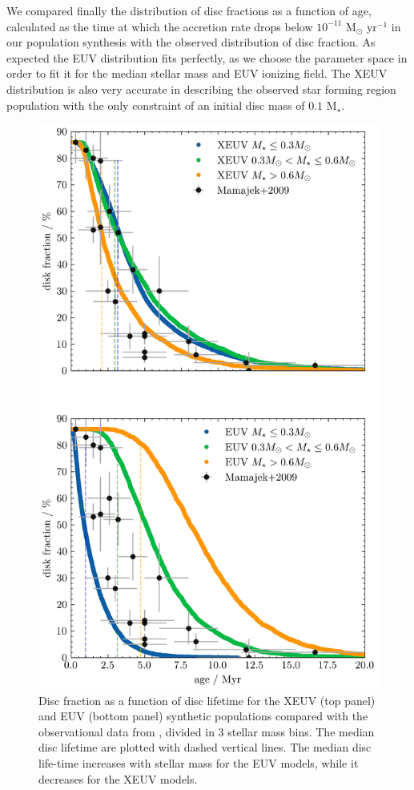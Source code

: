 \documentclass[fleqn,usenatbib,letters]{mnras}
\begin{document}
We compared finally the distribution of disc fractions as a function of age, calculated as the time at which the accretion rate drops below $10^{-11}$ M$_\odot$ yr$^{-1}$ in our population synthesis with the observed distribution of disc fraction. As expected the EUV distribution fits perfectly, as we choose the parameter space in order to fit it for the median stellar mass and EUV ionizing field. The XEUV distribution is also very accurate in describing the observed star forming region population with the only constraint of an initial disc mass of $0.1$ M$_\star$.
\begin{figure}
    \includegraphics[width=0.92\columnwidth]{disk_lifetime.png}
    \caption{Disc fraction as a function of disc lifetime for the XEUV (top panel) and EUV (bottom panel) synthetic populations compared with the observational data from \citet{Mamajek2009}, divided in 3 stellar mass bins. The median disc lifetime are plotted with dashed vertical lines. The median disc life-time increases with stellar mass for the EUV models, while it decreases for the XEUV models. \label{fig:frac_time}}
\end{figure}
\end{document}
